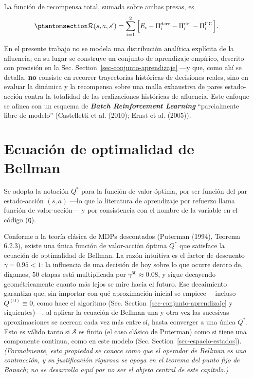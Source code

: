 \documentclass[
  letterpaper,
  DIV=11,
  numbers=noendperiod]{scrreprt}
\theoremstyle{definition}
\theoremstyle{remark}
\begin{document}
La función de recompensa total, sumada sobre ambas presas, es
\begin{equation}\protect\phantomsection\label{eq-recompensa}{
\mathcal{R}(s,a,s') = \sum_{i=1}^{2}\Big[E_i - \Pi_i^{\text{derr}} - \Pi_i^{\text{def}} - \Pi_i^{\text{CG}}\Big].
}\end{equation}

En el presente trabajo no se modela una distribución analítica explícita
de la afluencia; en su lugar se construye un conjunto de aprendizaje
empírico, descrito con precisión en la Sec.
Section~\ref{sec-conjunto-aprendizaje} ---y que, como ahí se detalla,
\textbf{no} consiste en recorrer trayectorias históricas de decisiones
reales, sino en evaluar la dinámica y la recompensa sobre una malla
exhaustiva de pares estado-acción contra la totalidad de las
realizaciones históricas de afluencia. Este enfoque se alinea con un
esquema de \textbf{\emph{Batch Reinforcement Learning}} ``parcialmente
libre de modelo'' (Castelletti et al. (2010); Ernst et al. (2005)).

\section{Ecuación de optimalidad de
Bellman}\label{ecuaciuxf3n-de-optimalidad-de-bellman-1}

Se adopta la notación \(Q^*\) para la función de valor óptima, por ser
función del par estado-acción \((s,a)\) ---lo que la literatura de
aprendizaje por refuerzo llama función de valor-acción--- y por
consistencia con el nombre de la variable en el código (\texttt{Q}).

Conforme a la teoría clásica de MDPs descontados (Puterman (1994),
Teorema 6.2.3), existe una única función de valor-acción óptima \(Q^*\)
que satisface la ecuación de optimalidad de Bellman. La razón intuitiva
es el factor de descuento \(\gamma=0.95<1\): la influencia de una
decisión de hoy sobre lo que ocurre dentro de, digamos, 50 etapas está
multiplicada por \(\gamma^{50}\approx0.08\), y sigue decayendo
geométricamente cuanto más lejos se mire hacia el futuro. Ese
decaimiento garantiza que, sin importar con qué aproximación inicial se
empiece ---incluso \(Q^{(0)}\equiv0\), como hace el algoritmo (Sec.
Section~\ref{sec-conjunto-aprendizaje} y siguientes)---, al aplicar la
ecuación de Bellman una y otra vez las sucesivas aproximaciones se
acercan cada vez más entre sí, hasta converger a una única \(Q^*\). Esto
es válido tanto si \(\mathcal S\) es finito (el caso clásico de
Puterman) como si tiene una componente continua, como en este modelo
(Sec. Section~\ref{sec-espacio-estados}). \emph{(Formalmente, esta
propiedad se conoce como que el operador de Bellman es una contracción,
y su justificación rigurosa se apoya en el teorema del punto fijo de
Banach; no se desarrolla aquí por no ser el objeto central de este
capítulo.)}
\end{document}
